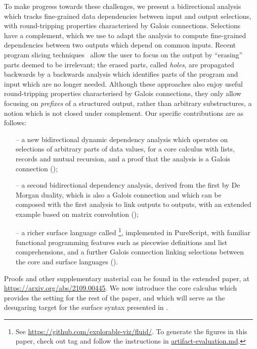 To make progress towards these challenges, we present a bidirectional analysis which tracks fine-grained data dependencies between input and output selections, with round-tripping properties characterised by Galois connections. Selections have a complement, which we use to adapt the analysis to compute fine-grained dependencies between two outputs which depend on common inputs. Recent program slicing techniques~\cite{perera12a,perera16d,ricciotti17} allow the user to focus on the output by ``erasing'' parts deemed to be irrelevant; the erased parts, called \emph{holes}, are propagated backwards by a backwards analysis which identifies parts of the program and input which are no longer needed. Although these approaches also enjoy useful round-tripping properties characterised by Galois connections, they only allow focusing on \emph{prefixes} of a structured output, rather than arbitrary substructures, a notion which is not closed under complement. Our specific contributions are as follows:

\begin{itemize}
   \item[--] a new bidirectional dynamic dependency analysis which operates on selections of arbitrary parts of data values, for a core calculus with lists, records and mutual recursion, and a proof that the analysis is a Galois connection ();
   \item[--] a second bidirectional dependency analysis, derived from the first by De Morgan duality, which is also a Galois connection and which can be composed with the first analysis to link outputs to outputs, with an extended example based on matrix convolution  ();
   \item[--] a richer surface language called \OurLanguage\footnote{See \url{https://github.com/explorable-viz/fluid/}. To generate the figures in this paper, check out tag  and follow the instructions in \href{https://github.com/explorable-viz/fluid/blob/v0.4.1/artifact-evaluation.md}{artifact-evaluation.md}.}, implemented in PureScript, with familiar functional programming features such as piecewise definitions and list comprehensions, and a further Galois connection linking selections between the core and surface languages ().
\end{itemize}

\noindent Proofs and other supplementary material can be found in the extended paper, at \url{https://arxiv.org/abs/2109.00445}. We now introduce the core calculus which provides the setting for the rest of the paper, and which will serve as the desugaring target for the surface syntax presented in .
